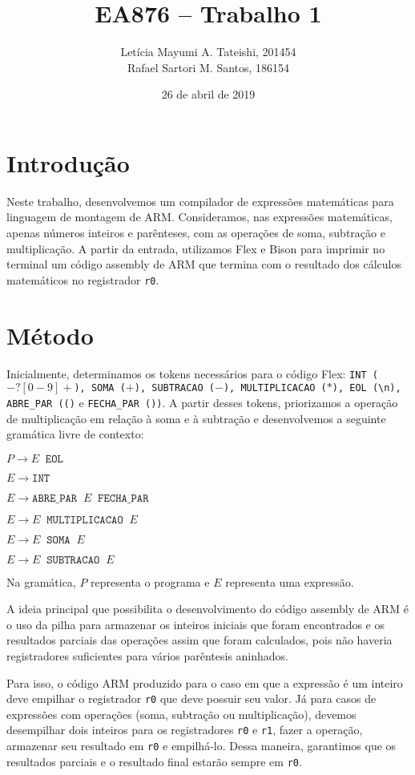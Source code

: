 \documentclass[brazilian,a4paper,twocolumn]{article}
\title{EA876 -- Trabalho 1}
\author{Letícia Mayumi A. Tateishi, 201454\\Rafael Sartori M. Santos, 186154}
\date{26 de abril de 2019}
\newcommand{\s}{\;\;}
\begin{document}
\maketitle

\section{Introdução}

    Neste trabalho, desenvolvemos um compilador de expressões matemáticas para linguagem de montagem de ARM. Consideramos, nas expressões matemáticas, apenas números inteiros e parênteses, com as operações de soma, subtração e multiplicação. A partir da entrada, utilizamos Flex e Bison para imprimir no terminal um código assembly de ARM que termina com o resultado dos cálculos matemáticos no registrador \texttt{r0}.

\section{Método}

    Inicialmente, determinamos os tokens necessários para o código Flex: \texttt{INT ($-?[0-9]+$), SOMA ($+$), SUBTRACAO ($-$), MULTIPLICACAO ($*$), EOL (\textbackslash{}n), ABRE\_PAR (()} e \texttt{FECHA\_PAR ())}. A partir desses tokens, priorizamos a operação de multiplicação em relação à soma e à subtração e desenvolvemos a seguinte gramática livre de contexto:

    $P \xrightarrow{} E \s \texttt{EOL}$

    $E \xrightarrow{} \texttt{INT}$

    $E \xrightarrow{} \texttt{ABRE\_PAR} \s E \s \texttt{FECHA\_PAR}$

    $E \xrightarrow{} E \s \texttt{MULTIPLICACAO} \s E$

    $E \xrightarrow{} E \s \texttt{SOMA} \s E$

    $E \xrightarrow{} E \s \texttt{SUBTRACAO} \s E$

    Na gramática, $P$ representa o programa e $E$ representa uma expressão.

    A ideia principal que possibilita o desenvolvimento do código assembly de ARM é o uso da pilha para armazenar os inteiros iniciais que foram encontrados e os resultados parciais das operações assim que foram calculados, pois não haveria registradores suficientes para vários parêntesis aninhados.

    Para isso, o código ARM produzido para o caso em que a expressão é um inteiro deve empilhar o registrador \texttt{r0} que deve possuir seu valor. Já para casos de expressões com operações (soma, subtração ou multiplicação), devemos desempilhar dois inteiros para os registradores \texttt{r0} e \texttt{r1}, fazer a operação, armazenar seu resultado em \texttt{r0} e empilhá-lo. Dessa maneira, garantimos que os resultados parciais e o resultado final estarão sempre em \texttt{r0}.
\end{document}
